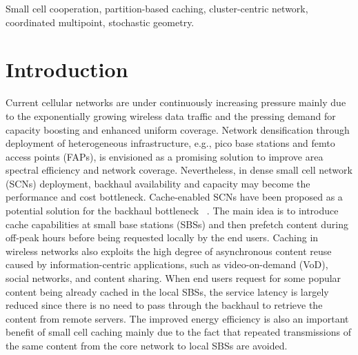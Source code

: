 \documentclass[twocolumns,10pt]{IEEEtran}
\begin{document}
\begin{keywords}	
		Small cell cooperation, partition-based caching, cluster-centric network, coordinated multipoint, stochastic geometry.
\end{keywords}
	
\section{Introduction}
Current cellular networks are under continuously increasing pressure mainly due to the exponentially growing wireless data traffic and the pressing demand for capacity boosting and enhanced uniform coverage. Network densification through deployment of heterogeneous infrastructure, e.g., pico base stations and femto access points (FAPs), is envisioned as a promising solution to improve area spectral efficiency and network coverage. Nevertheless, in dense small cell network (SCNs) deployment, backhaul availability and capacity may become the performance and cost bottleneck. 
Cache-enabled SCNs have been proposed as a potential solution for the backhaul bottleneck  ~\cite{caching_edge, femtocaching, femtocaching2013, clustering}. The main idea is to introduce cache capabilities at small base stations (SBSs) and then prefetch content during off-peak hours before being requested locally by the end users. Caching in wireless networks also exploits the high degree of asynchronous content reuse caused by information-centric applications, such as video-on-demand (VoD), social networks, and content sharing. When end users request for some popular content being already cached in the local SBSs, the service latency is largely reduced since there is no need to pass through the backhaul to retrieve the content from remote servers. The improved energy efficiency is also an important benefit of small cell caching mainly due to the fact that repeated transmissions of the same content from the core network to local SBSs are avoided. 
\end{document}
